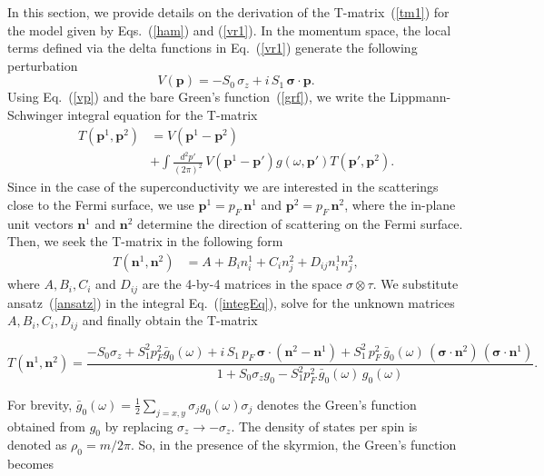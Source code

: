 \documentclass[twocolumn,showpacs,floatfix,longbibliography]{revtex4-1}
\begin{document}
In this section, we provide details on the derivation of the T-matrix~(\ref{tm1}) for the model given by Eqs.~(\ref{ham}) and (\ref{vr1}).  In the momentum space, the local terms defined via the delta functions in Eq.~(\ref{vr1}) generate the following perturbation
\begin{equation}
	V(\bm p) = -S_0\,\sigma_z +  i \,S_1 \, \bm \sigma\cdot \bm  p.
	\label{vp}
\end{equation}
Using Eq.~(\ref{vp}) and the bare Green's function~(\ref{grf}), we write the Lippmann-Schwinger integral equation for the T-matrix
\begin{align}
	T\left(\bm p^{1},\bm p^{2}\right) &= V \left(\bm p^{1}-\bm p^{2}\right) \nonumber \\
	& +\int \frac{d^2 p'}{\left( 2\pi \right)^2}\, V\left(\bm p^{1}-\bm p'\right) g(\omega,\bm p')  T\left(\bm p',\bm p^{2}\right).
	\label{integEq}
\end{align}
Since in the case of the superconductivity we are interested in the scatterings close to the Fermi surface, we use $\bm p^{1} = p_F\, \bm n^{1}$ and $\bm p^{2} = p_F \,\bm n^{2}$, where the in-plane unit vectors $\bm n^{1}$ and $\bm n^{2}$ determine the direction of scattering on the Fermi surface.  Then, we seek the T-matrix in the following form
\begin{align}
	T\left(\bm n^{1},\bm n^{2}\right) &= A + B_i n^{1}_i + C_i n^{2}_j + D_{ij} n^{1}_i n^{2}_j, \label{ansatz}
\end{align}
where  $A,B_i,C_i$ and $D_{ij}$ are the 4-by-4 matrices in the space $\sigma\otimes\tau$. We substitute ansatz~(\ref{ansatz}) in the integral Eq.~(\ref{integEq}), solve for the unknown matrices $A,B_i,C_i,D_{ij}$ and finally obtain the T-matrix
\begin{widetext}
\begin{equation}
	T\left(\bm n^{1},\bm n^{2}\right) = \frac{-S_0\sigma_z+S^2_1p_F^2\bar g_{0}(\omega)+i\,S_1\,p_F \,  \bm \sigma\cdot(\bm n^{2}- \bm n^{1}) +S^2_1\, p^2_F \, \bar g_{0}(\omega)\,\left(\bm \sigma\cdot\bm n^{2}\right)\,\left(\bm \sigma\cdot \bm n^{1}\right)}{1+S_0\sigma_zg_{0}-S^2_1p_F^2\,\bar g_{0}(\omega)\, g_{0}(\omega)}. \label{TM}
\end{equation}
\end{widetext}
For brevity, $\bar g_0(\omega) = \frac{1}{2}\sum_{j=x,y} \sigma_j g_0(\omega) \sigma_j $ denotes the Green's function obtained from $g_{0}$ by replacing $\sigma_z \rightarrow - \sigma_z$. The density of states per spin is denoted as $\rho_0 = m/2\pi$. So, in the presence of the skyrmion, the Green's function becomes
\end{document}
